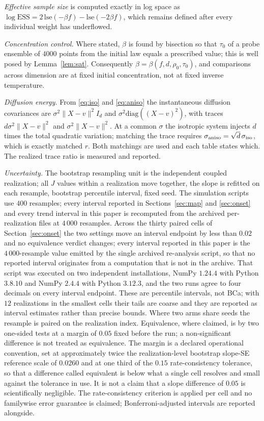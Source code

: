 \documentclass[pdflatex,sn-mathphys-num]{sn-jnl}
\theoremstyle{thmstyleone}
\theoremstyle{thmstyletwo}
\theoremstyle{thmstylethree}
\begin{document}
\emph{Effective sample size} is computed exactly in log space as $\log\mathrm{ESS}=2\,\mathrm{lse}(-\beta f)-\mathrm{lse}(-2\beta f)$, which remains defined after every individual weight has underflowed.

\emph{Concentration control.} Where stated, $\beta$ is found by bisection so that $\tau_0$ of a probe ensemble of $4000$ points from the initial law equals a prescribed value; this is well posed by Lemma~\ref{lem:sat}. Consequently $\beta=\beta(f,d,\rho_0,\tau_0)$, and comparisons across dimension are at fixed initial concentration, not at fixed inverse temperature.

\emph{Diffusion energy.} From \eqref{eq:iso} and \eqref{eq:aniso} the instantaneous diffusion covariances are $\sigma^2\|X-v\|^2I_d$ and $\sigma^2\mathrm{diag}((X-v)^2)$, with traces $d\sigma^2\|X-v\|^2$ and $\sigma^2\|X-v\|^2$. At a common $\sigma$ the isotropic system injects $d$ times the total quadratic variation; matching the trace requires $\sigma_{\rm aniso}=\sqrt d\,\sigma_{\rm iso}$, which is exactly matched $r$. Both matchings are used and each table states which. The realized trace ratio is measured and reported.

\emph{Uncertainty.} The bootstrap resampling unit is the independent coupled realization; all $J$ values within a realization move together, the slope is refitted on each resample, bootstrap percentile interval, fixed seed. The simulation scripts use $400$ resamples; every interval reported in Sections~\ref{sec:map} and \ref{sec:onset} and every trend interval in this paper is recomputed from the archived per-realization files at $4\,000$ resamples. Across the thirty paired cells of Section~\ref{sec:onset} the two settings move an interval endpoint by less than $0.02$ and no equivalence verdict changes; every interval reported in this paper is the $4\,000$-resample value emitted by the single archived re-analysis script, so that no reported interval originates from a computation that is not in the archive. That script was executed on two independent installations, NumPy $1.24.4$ with Python $3.8.10$ and NumPy $2.4.4$ with Python $3.12.3$, and the two runs agree to four decimals on every interval endpoint. These are percentile intervals, not BCa; with $12$ realizations in the smallest cells their tails are coarse and they are reported as interval estimates rather than precise bounds. Where two arms share seeds the resample is paired on the realization index. Equivalence, where claimed, is by two one-sided tests at a margin of $0.05$ fixed before the run; a non-significant difference is not treated as equivalence. The margin is a declared operational convention, set at approximately twice the realization-level bootstrap slope-SE reference scale of $0.0260$ and at one third of the $0.15$ rate-consistency tolerance, so that a difference called equivalent is below what a single cell resolves and small against the tolerance in use. It is not a claim that a slope difference of $0.05$ is scientifically negligible. The rate-consistency criterion is applied per cell and no familywise error guarantee is claimed; Bonferroni-adjusted intervals are reported alongside.
\end{document}
